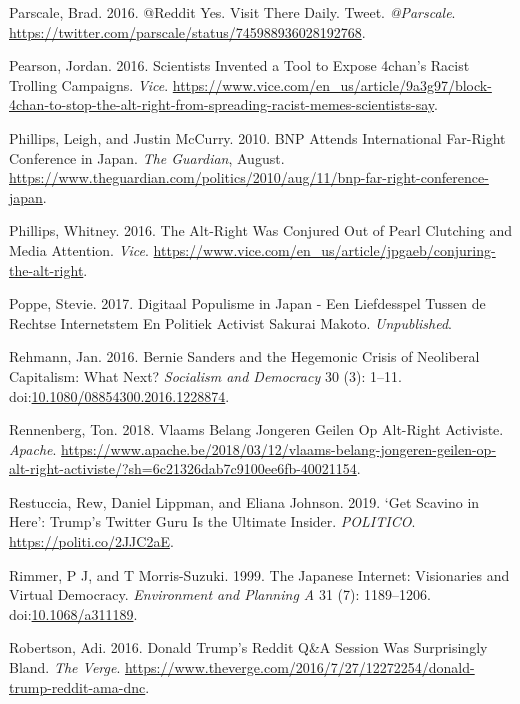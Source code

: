 \documentclass[10pt,british,A4paper,,openany]{memoir}
\begin{document}
\hypertarget{ref-parscale_reddit_2016}{}
Parscale, Brad. 2016. @Reddit Yes. Visit There Daily. Tweet.
\emph{@Parscale}.
\url{https://twitter.com/parscale/status/745988936028192768}.

\hypertarget{ref-pearson_scientists_2016}{}
Pearson, Jordan. 2016. Scientists Invented a Tool to Expose 4chan's
Racist Trolling Campaigns. \emph{Vice}.
\url{https://www.vice.com/en_us/article/9a3g97/block-4chan-to-stop-the-alt-right-from-spreading-racist-memes-scientists-say}.

\hypertarget{ref-phillips_bnp_2010}{}
Phillips, Leigh, and Justin McCurry. 2010. BNP Attends International
Far-Right Conference in Japan. \emph{The Guardian}, August.
\url{https://www.theguardian.com/politics/2010/aug/11/bnp-far-right-conference-japan}.

\hypertarget{ref-phillips_alt-right_2016}{}
Phillips, Whitney. 2016. The Alt-Right Was Conjured Out of Pearl
Clutching and Media Attention. \emph{Vice}.
\url{https://www.vice.com/en_us/article/jpgaeb/conjuring-the-alt-right}.

\hypertarget{ref-poppe_digitaal_2017}{}
Poppe, Stevie. 2017. Digitaal Populisme in Japan - Een Liefdesspel
Tussen de Rechtse Internetstem En Politiek Activist Sakurai Makoto.
\emph{Unpublished}.

\hypertarget{ref-rehmann_bernie_2016}{}
Rehmann, Jan. 2016. Bernie Sanders and the Hegemonic Crisis of
Neoliberal Capitalism: What Next? \emph{Socialism and Democracy} 30 (3):
1--11.
doi:\href{https://doi.org/10.1080/08854300.2016.1228874}{10.1080/08854300.2016.1228874}.

\hypertarget{ref-rennenberg_vlaams_2018}{}
Rennenberg, Ton. 2018. Vlaams Belang Jongeren Geilen Op Alt-Right
Activiste. \emph{Apache}.
\url{https://www.apache.be/2018/03/12/vlaams-belang-jongeren-geilen-op-alt-right-activiste/?sh=6c21326dab7c9100ee6fb-40021154}.

\hypertarget{ref-restuccia_get_2019}{}
Restuccia, Rew, Daniel Lippman, and Eliana Johnson. 2019. `Get Scavino
in Here': Trump's Twitter Guru Is the Ultimate Insider. \emph{POLITICO}.
\url{https://politi.co/2JJC2aE}.

\hypertarget{ref-rimmer_japanese_1999}{}
Rimmer, P J, and T Morris-Suzuki. 1999. The Japanese Internet:
Visionaries and Virtual Democracy. \emph{Environment and Planning A} 31
(7): 1189--1206.
doi:\href{https://doi.org/10.1068/a311189}{10.1068/a311189}.

\hypertarget{ref-robertson_donald_2016}{}
Robertson, Adi. 2016. Donald Trump's Reddit Q\&A Session Was
Surprisingly Bland. \emph{The Verge}.
\url{https://www.theverge.com/2016/7/27/12272254/donald-trump-reddit-ama-dnc}.
\end{document}
